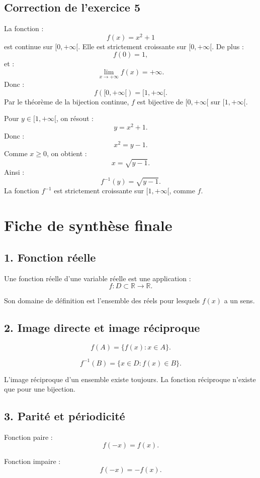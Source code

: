 \documentclass[11pt,a4paper]{article}
\newcommand{\R}{\mathbb R}
\begin{document}
\subsection*{Correction de l'exercice 5}

La fonction :
\[
f(x)=x^2+1
\]
est continue sur \([0,+\infty[\).  
Elle est strictement croissante sur \([0,+\infty[\).  
De plus :
\[
f(0)=1,
\]
et :
\[
\lim_{x\to+\infty}f(x)=+\infty.
\]
Donc :
\[
f([0,+\infty[)=[1,+\infty[.
\]
Par le théorème de la bijection continue, \(f\) est bijective de \([0,+\infty[\) sur \([1,+\infty[\).

Pour \(y\in[1,+\infty[\), on résout :
\[
y=x^2+1.
\]
Donc :
\[
x^2=y-1.
\]
Comme \(x\geq0\), on obtient :
\[
x=\sqrt{y-1}.
\]
Ainsi :
\[
f^{-1}(y)=\sqrt{y-1}.
\]
La fonction \(f^{-1}\) est strictement croissante sur \([1,+\infty[\), comme \(f\).

\newpage
\section{Fiche de synthèse finale}

\subsection*{1. Fonction réelle}

Une fonction réelle d'une variable réelle est une application :
\[
f:D\subset\R\to\R.
\]

Son domaine de définition est l'ensemble des réels pour lesquels \(f(x)\) a un sens.

\subsection*{2. Image directe et image réciproque}

\[
f(A)=\{f(x):x\in A\}.
\]

\[
f^{-1}(B)=\{x\in D:f(x)\in B\}.
\]

L'image réciproque d'un ensemble existe toujours.  
La fonction réciproque n'existe que pour une bijection.

\subsection*{3. Parité et périodicité}

Fonction paire :
\[
f(-x)=f(x).
\]

Fonction impaire :
\[
f(-x)=-f(x).
\]
\end{document}
